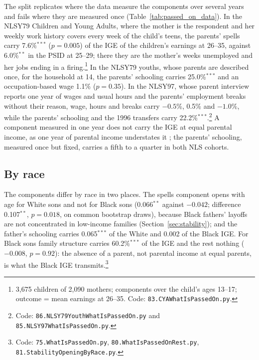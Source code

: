 The split replicates where the data measure the components over several years and fails where they are measured once
(Table~\ref{tab:passed_on_data}). In the NLSY79 Children and Young Adults, where the mother is the respondent and her
weekly work history covers every week of the child's teens, the parents' spells carry 7.6\%$^{***}$ ($p = 0.005$) of the
IGE of the children's earnings at 26--35, against 6.0\%$^{**}$ in the PSID at 25--29; there they are the mother's weeks
unemployed and her jobs ending in a firing.\footnote{3,675 children of 2,090 mothers; components over the child's ages
13--17; outcome = mean earnings at 26--35. Code: \texttt{83.CYAWhatIsPassedOn.py}.} In the NLSY79 youths, whose
parents are described once, for the household at 14, the parents' schooling carries 25.0\%$^{***}$ and an occupation-based
wage 1.1\% ($p = 0.35$). In the NLSY97, whose parent interview reports one year of wages and usual hours and the
parents' employment breaks without their reason, wage, hours and breaks carry $-0.5$\%, 0.5\% and $-1.0$\%, while the
parents' schooling and the 1996 transfers carry 22.2\%$^{***}$.\footnote{Code: \texttt{86.NLSY79YouthWhatIsPassedOn.py}
and \texttt{85.NLSY97WhatIsPassedOn.py}.} A component measured in one year does not carry the IGE at equal parental
income, as one year of parental income understates it \citep{solon1992intergenerational, mazumder2005fortunate}; the
parents' schooling, measured once but fixed, carries a fifth to a quarter in both NLS cohorts.



\subsection{By race}

The components differ by race in two places. The spells component opens with age for White sons and not for Black sons
(0.066$^{**}$ against $-0.042$; difference 0.107$^{**}$, $p = 0.018$, on common bootstrap draws), because Black fathers'
layoffs are not concentrated in low-income families (Section~\ref{sec:stability}); and the father's schooling carries
0.065$^{***}$ of the White and 0.002 of the Black IGE. For Black sons family structure carries 60.2\%$^{***}$ of the IGE
and the rest nothing ($-0.008$, $p = 0.92$): the absence of a parent, not parental income at equal parents, is what
the Black IGE transmits.\footnote{Code: \texttt{75.WhatIsPassedOn.py}, \texttt{80.WhatIsPassedOnRest.py},
\texttt{81.StabilityOpeningByRace.py}.}

